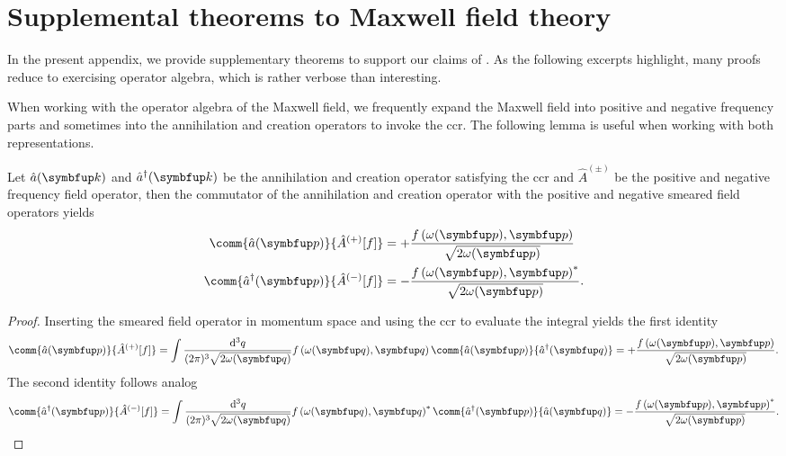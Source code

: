 \chapter{Supplemental theorems to Maxwell field theory}

In the present appendix, we provide supplementary theorems to support our claims of .
As the following excerpts highlight, many proofs reduce to exercising operator algebra, which is rather verbose than interesting.

When working with the operator algebra of the Maxwell field, we frequently expand the Maxwell field into positive and negative frequency parts and sometimes into the annihilation and creation operators to invoke the \gls{ccr}.
The following lemma is useful when working with both representations.
\begin{lemma}\label{th:annihilation_field_commutators}
	Let $\hat{a}(\vb{k})$ and $\hat{a}^\dagger(\vb{k})$ be the annihilation and creation operator satisfying the \gls{ccr} and $\hat{A}^{(\pm)}$ be the positive and negative frequency field operator, then the commutator of the annihilation and creation operator with the positive and negative smeared field operators yields
	\begin{align}
		\comm{\hat{a}(\vb{p})}{\hat{A}^{(+)}[f]}
		&=
		+\frac{f\left(\omega(\vb{p}),\vb{p}\right)}{\sqrt{2\omega(\vb{p})}}
		\\
		\comm{\hat{a}^\dagger(\vb{p})}{\hat{A}^{(-)}[f]}
		&=
		-\frac{f\left(\omega(\vb{p}),\vb{p}\right)^*}{\sqrt{2\omega(\vb{p})}}
		.
	\end{align}
\end{lemma}
\begin{proof}
	Inserting the smeared field operator in momentum space and using the \gls{ccr} to evaluate the integral yields the first identity
	\begin{equation}
		\comm{\hat{a}(\vb{p})}{\hat{A}^{(+)}[f]}
		=
		\int\frac{\dd[3]{q}}{(2\pi)^3\sqrt{2\omega(\vb{q})}}
		f\left(\omega(\vb{q}),\vb{q}\right)
		\comm{\hat{a}(\vb{p})}{\hat{a}^\dagger(\vb{q})}
		=
		+\frac{f\left(\omega(\vb{p}),\vb{p}\right)}{\sqrt{2\omega(\vb{p})}}
		.
	\end{equation}
	The second identity follows analog
	\begin{equation}
		\comm{\hat{a}^\dagger(\vb{p})}{\hat{A}^{(-)}[f]}
		=
		\int\frac{\dd[3]{q}}{(2\pi)^3\sqrt{2\omega(\vb{q})}}
		f\left(\omega(\vb{q}),\vb{q}\right)^*
		\comm{\hat{a}^\dagger(\vb{p})}{\hat{a}(\vb{q})}
		=
		-\frac{f\left(\omega(\vb{p}),\vb{p}\right)^*}{\sqrt{2\omega(\vb{p})}}
		.
	\end{equation}
\end{proof}
